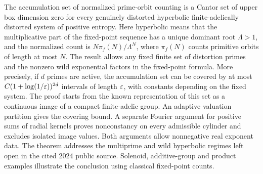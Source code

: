 The accumulation set of normalized prime-orbit counting is a Cantor set
of upper box dimension zero for every genuinely distorted hyperbolic
finite-adelically distorted system of positive entropy. Here hyperbolic
means that the multiplicative part of the fixed-point sequence has a unique
dominant root $\Lambda>1$, and the normalized count is
$N\pi_f(N)/\Lambda^N$, where $\pi_f(N)$ counts primitive orbits of length
at most $N$. The result allows any fixed finite set of distortion primes
and the nonzero wild exponential factors in the fixed-point formula.
More precisely, if $d$ primes are active, the accumulation set can be
covered by at most $C(1+\log(1/\varepsilon))^{2d}$ intervals of length $\varepsilon$,
with constants depending on the fixed system. The proof starts from the
known representation of this set as a continuous image of a compact
finite-adelic group. An adaptive valuation partition gives the covering
bound. A separate Fourier argument for positive sums of radial kernels
proves nonconstancy on every admissible cylinder and excludes isolated
image values. Both arguments allow nonnegative real exponent data. The
theorem addresses the multiprime and wild hyperbolic regimes left open in
the cited 2024 public source. Solenoid, additive-group and product examples
illustrate the conclusion using classical fixed-point counts.
